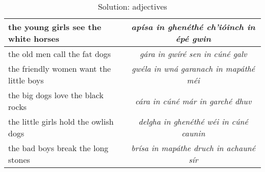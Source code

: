 \begin{table}[H]
{\begin{tabu}{|l|>{\itshape}c|}
    \midrule
    the young girls see the white horses & ap\'{i}sa in ghen\'{e}th\'{e} ch'i\'{o}inch in \'{e}p\'{e} gwin\\
    \midrule
    the old men call the fat dogs & g\'{a}ra in gw\'{i}r\'{e} sen in c\'{u}n\'{e} galv\\
    \midrule
    the friendly women want the little boys & gw\'{e}la in wn\'{a} garanach in map\'{a}th\'{e} m\'{e}i\\
    \midrule
    the big dogs love the black rocks & c\'{a}ra in c\'{u}n\'{e} m\'{a}r in garch\'{e} dhuv\\
    \midrule
    the little girls hold the owlish dogs & delgha in ghen\'{e}th\'{e} w\'{e}i in c\'{u}n\'{e} caunin\\
    \midrule
    the bad boys break the long stones & br\'{i}sa in map\'{a}the druch in achaun\'{e} s\'{i}r\\
    \bottomrule
  \end{tabu}
}
\label{solution_adjectives}
\caption{Solution: adjectives}
\end{table}
